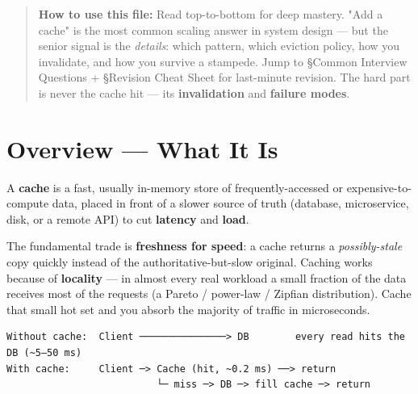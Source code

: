 \documentclass[11pt]{article}
\begin{document}
\makecoverpage

\thispagestyle{empty}
{\hypersetup{hidelinks}\tableofcontents}
\clearpage

\begin{quote}
\textbf{How to use this file:} Read top-to-bottom for deep mastery. "Add a cache" is the most common scaling answer in system design --- but the senior signal is the \emph{details}: which pattern, which eviction policy, how you invalidate, and how you survive a stampede. Jump to §Common Interview Questions + §Revision Cheat Sheet for last-minute revision. The hard part is never the cache hit --- it\textquotesingle s \textbf{invalidation} and \textbf{failure modes}.
\end{quote}

\section{Overview --- What It Is}\label{overview--what-it-is}

A \textbf{cache} is a fast, usually in-memory store of frequently-accessed or expensive-to-compute data, placed in front of a slower source of truth (database, microservice, disk, or a remote API) to cut \textbf{latency} and \textbf{load}.

The fundamental trade is \textbf{freshness for speed}: a cache returns a \emph{possibly-stale} copy quickly instead of the authoritative-but-slow original. Caching works because of \textbf{locality} --- in almost every real workload a small fraction of the data receives most of the requests (a Pareto / power-law / Zipfian distribution). Cache that small hot set and you absorb the majority of traffic in microseconds.

\setcodelang{}

\begin{verbatim}
Without cache:  Client ───────────────> DB        every read hits the DB (~5–50 ms)
With cache:     Client ─> Cache (hit, ~0.2 ms) ──> return
                          └─ miss ─> DB ─> fill cache ─> return
\end{verbatim}
\end{document}
